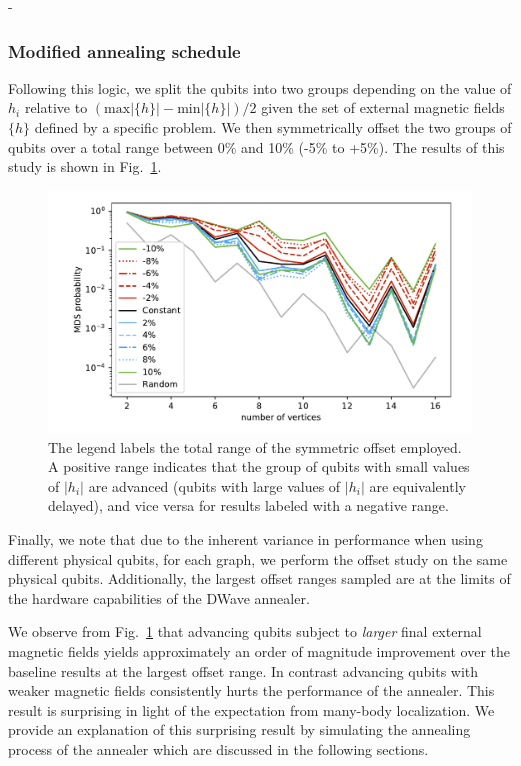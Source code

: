 -\documentclass[prd,twocolumn,tightenlines,preprintnumbers,showpacs,superscriptaddress,notitlepage,nofootinbib,eqsecnum,floatfix,longbibliography]{revtex4}
\begin{document}
\subsubsection{Modified annealing schedule}

Following this logic, we split the qubits into two groups depending on the value of $h_i$ relative to $(\textrm{max}|\{h\}| - \textrm{min}|\{h\}|) / 2$ given the set of external magnetic fields $\{h\}$ defined by a specific problem.
We then symmetrically offset the two groups of qubits over a total range between 0\% and 10\% (-5\% to +5\%).
The results of this study is shown in Fig.~\ref{fig:dwave_offset}.

\begin{figure}[b]
    \centering
    \includegraphics[width=\columnwidth]{./figures/scaling_comparison_all.pdf}
    \caption{The legend labels the total range of the symmetric offset employed.
A positive range indicates that the group of qubits with small values of $|h_i|$ are advanced (qubits with large values of $|h_i|$ are equivalently delayed), and vice versa for results labeled with a negative range.}
    \label{fig:dwave_offset}
\end{figure}

Finally, we note that due to the inherent variance in performance when using different physical qubits, for each graph, we perform the offset study on the same physical qubits.
Additionally, the largest offset ranges sampled are at the limits of the hardware capabilities of the DWave annealer.

We observe from Fig.~\ref{fig:dwave_offset} that advancing qubits subject to \textit{larger} final external magnetic fields yields approximately an order of magnitude improvement over the baseline results at the largest offset range.
In contrast advancing qubits with weaker magnetic fields consistently hurts the performance of the annealer.
This result is surprising in light of the expectation from many-body localization.
We provide an explanation of this surprising result by simulating the annealing process of the annealer which are discussed in the following sections.
\end{document}
